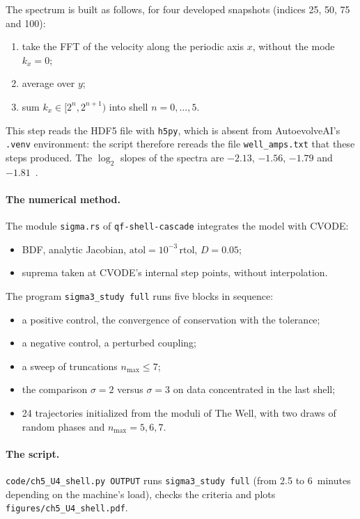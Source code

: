 The spectrum is built as follows, for four developed snapshots (indices 25, 50, 75 and 100):
\begin{enumerate}
\item take the FFT of the velocity along the periodic axis $x$, without the mode $k_x=0$;
\item average over $y$;
\item sum $k_x\in[2^n,2^{n+1})$ into shell $n=0,\dots,5$.
\end{enumerate}
This step reads the HDF5 file with \texttt{h5py}, which is absent from AutoevolveAI's \texttt{.venv} environment: the script
therefore rereads the file \texttt{well\_amps.txt} that these steps produced. The $\log_2$ slopes of the spectra are
$-2.13$, $-1.56$, $-1.79$ and $-1.81$~\cite{ch5:sigma3}.

\paragraph{The numerical method.} The module \texttt{sigma.rs} of \texttt{qf-shell-cascade} integrates the model with CVODE:
\begin{itemize}
\item BDF, analytic Jacobian, $\mathrm{atol}=10^{-3}\,\mathrm{rtol}$, $D=0.05$;
\item suprema taken at CVODE's internal step points, without interpolation.
\end{itemize}
The program \texttt{sigma3\_study full} runs five blocks in sequence:
\begin{itemize}
\item a positive control, the convergence of conservation with the tolerance;
\item a negative control, a perturbed coupling;
\item a sweep of truncations $n_{\max}\le7$;
\item the comparison $\sigma=2$ versus $\sigma=3$ on data concentrated in the last shell;
\item 24 trajectories initialized from the moduli of The Well, with two draws of random phases and
$n_{\max}=5,6,7$.
\end{itemize}

\paragraph{The script.} \texttt{code/ch5\_U4\_shell.py OUTPUT} runs \texttt{sigma3\_study full} (from 2.5 to 6~minutes
depending on the machine's load), checks the criteria and plots \texttt{figures/ch5\_U4\_shell.pdf}.

